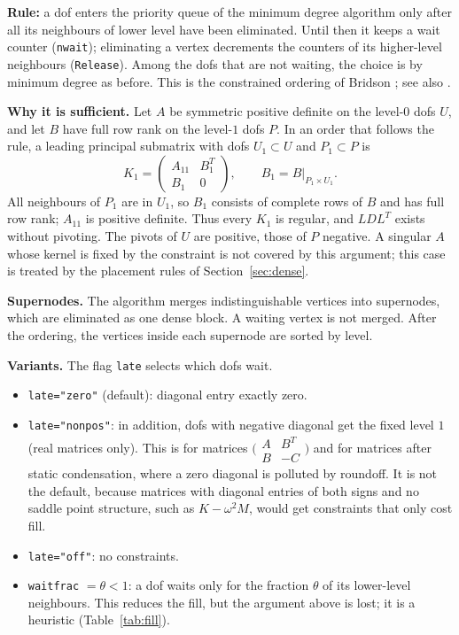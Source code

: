 \documentclass[10pt,a4paper]{article}
\newcommand{\code}[1]{\texttt{#1}}
\begin{document}
\textbf{Rule:} a dof enters the priority queue of the minimum degree algorithm only after all its neighbours of lower level have been eliminated. Until then it keeps a wait counter (\code{nwait}); eliminating a vertex decrements the counters of its higher-level neighbours (\code{Release}). Among the dofs that are not waiting, the choice is by minimum degree as before. This is the constrained ordering of Bridson \cite{bridson}; see also \cite{tuma}.

\textbf{Why it is sufficient.} Let $A$ be symmetric positive definite on the level-$0$ dofs $U$, and let $B$ have full row rank on the level-$1$ dofs $P$. In an order that follows the rule, a leading principal submatrix with dofs $U_1\subset U$ and $P_1\subset P$ is
\[
K_1 = \begin{pmatrix} A_{11} & B_1^T \\ B_1 & 0 \end{pmatrix},\qquad B_1 = B|_{P_1\times U_1}.
\]
All neighbours of $P_1$ are in $U_1$, so $B_1$ consists of complete rows of $B$ and has full row rank; $A_{11}$ is positive definite. Thus every $K_1$ is regular, and $LDL^T$ exists without pivoting. The pivots of $U$ are positive, those of $P$ negative.
A singular $A$ whose kernel is fixed by the constraint is not covered by this argument; this case is treated by the placement rules of Section~\ref{sec:dense}.

\textbf{Supernodes.} The algorithm merges indistinguishable vertices into supernodes, which are eliminated as one dense block. A waiting vertex is not merged. After the ordering, the vertices inside each supernode are sorted by level.

\textbf{Variants.} The flag \code{late} selects which dofs wait.
\begin{itemize}\setlength\itemsep{1pt}
\item \code{late="zero"} (default): diagonal entry exactly zero.
\item \code{late="nonpos"}: in addition, dofs with negative diagonal get the fixed level $1$ (real matrices only). This is for matrices $\bigl(\begin{smallmatrix} A & B^T\\ B & -C\end{smallmatrix}\bigr)$ and for matrices after static condensation, where a zero diagonal is polluted by roundoff. It is not the default, because matrices with diagonal entries of both signs and no saddle point structure, such as $K-\omega^2 M$, would get constraints that only cost fill.
\item \code{late="off"}: no constraints.
\item \code{waitfrac} $=\theta<1$: a dof waits only for the fraction $\theta$ of its lower-level neighbours. This reduces the fill, but the argument above is lost; it is a heuristic (Table~\ref{tab:fill}).
\end{itemize}
\end{document}
